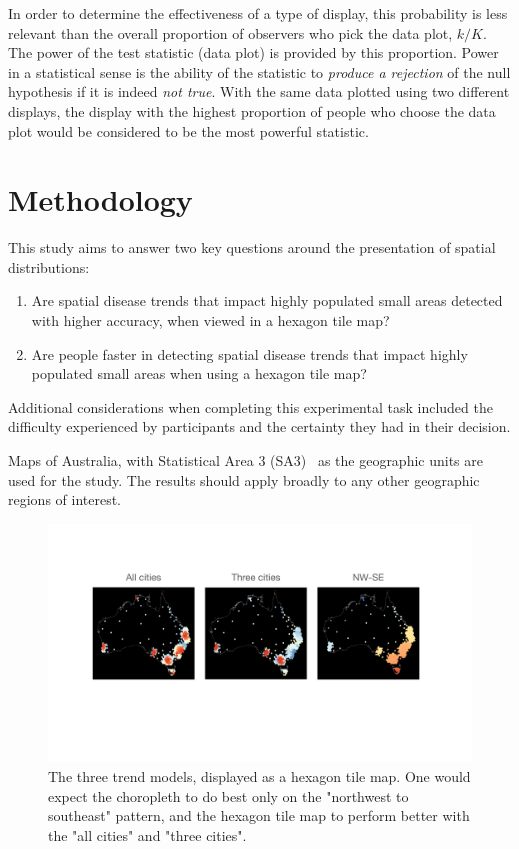 \documentclass[journal]{vgtc}                     %
\begin{document}
In order to determine the effectiveness of a type of display, this probability is less relevant than the overall proportion of observers who pick the data plot, \(k/K\). The power of the test statistic (data plot) is provided by this proportion. Power in a statistical sense is the ability of the statistic to \emph{produce a rejection} of the null hypothesis if it is indeed \emph{not true}. With the same data plotted using two different displays, the display with the highest proportion of people who choose the data plot would be considered to be the most powerful statistic.

\hypertarget{methodology}{%
\section{Methodology}\label{methodology}}

This study aims to answer two key questions around the presentation of spatial distributions:

\begin{enumerate}
\def\labelenumi{\arabic{enumi}.}
\item
  Are spatial disease trends that impact highly populated small areas detected with higher accuracy, when viewed in a hexagon tile map?
\item
  Are people faster in detecting spatial disease trends that impact highly populated small areas when using a hexagon tile map?
\end{enumerate}

Additional considerations when completing this experimental task included the difficulty experienced by participants and the certainty they had in their decision.

Maps of Australia, with Statistical Area 3 (SA3)~\cite{abs2016} as the geographic units are used for the study. The results should apply broadly to any other geographic regions of interest.

\begin{figure}[h]
\centering 
  \includegraphics[width=0.98\linewidth]{figures/factors.pdf} 
\caption{The three trend models, displayed as a hexagon tile map. One would expect the choropleth to do best only on the "northwest to southeast" pattern, and the hexagon tile map to perform better with the "all cities" and "three cities".}\label{fig:factors}
\end{figure}
\end{document}
